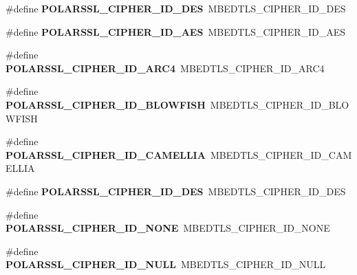 \begin{DoxyCompactItemize}
\#define {\bfseries P\+O\+L\+A\+R\+S\+S\+L\+\_\+\+C\+I\+P\+H\+E\+R\+\_\+\+I\+D\+\_\+D\+ES}~M\+B\+E\+D\+T\+L\+S\+\_\+\+C\+I\+P\+H\+E\+R\+\_\+\+I\+D\+\_\+D\+ES
\item 
\mbox{\label{compat-1_83_8h_adab88e39846506f6247c2364210072d4}} 
\#define {\bfseries P\+O\+L\+A\+R\+S\+S\+L\+\_\+\+C\+I\+P\+H\+E\+R\+\_\+\+I\+D\+\_\+\+A\+ES}~M\+B\+E\+D\+T\+L\+S\+\_\+\+C\+I\+P\+H\+E\+R\+\_\+\+I\+D\+\_\+\+A\+ES
\item 
\mbox{\label{compat-1_83_8h_a7b0e1787741b4ef7547026c45a011726}} 
\#define {\bfseries P\+O\+L\+A\+R\+S\+S\+L\+\_\+\+C\+I\+P\+H\+E\+R\+\_\+\+I\+D\+\_\+\+A\+R\+C4}~M\+B\+E\+D\+T\+L\+S\+\_\+\+C\+I\+P\+H\+E\+R\+\_\+\+I\+D\+\_\+\+A\+R\+C4
\item 
\mbox{\label{compat-1_83_8h_aad6c4e11a37cef65e21e01202078223c}} 
\#define {\bfseries P\+O\+L\+A\+R\+S\+S\+L\+\_\+\+C\+I\+P\+H\+E\+R\+\_\+\+I\+D\+\_\+\+B\+L\+O\+W\+F\+I\+SH}~M\+B\+E\+D\+T\+L\+S\+\_\+\+C\+I\+P\+H\+E\+R\+\_\+\+I\+D\+\_\+\+B\+L\+O\+W\+F\+I\+SH
\item 
\mbox{\label{compat-1_83_8h_a9b076c3dcc9545751c82943374cd4380}} 
\#define {\bfseries P\+O\+L\+A\+R\+S\+S\+L\+\_\+\+C\+I\+P\+H\+E\+R\+\_\+\+I\+D\+\_\+\+C\+A\+M\+E\+L\+L\+IA}~M\+B\+E\+D\+T\+L\+S\+\_\+\+C\+I\+P\+H\+E\+R\+\_\+\+I\+D\+\_\+\+C\+A\+M\+E\+L\+L\+IA
\item 
\mbox{\label{compat-1_83_8h_a7cda621d0e88257c164b4672fcfd0acd}} 
\#define {\bfseries P\+O\+L\+A\+R\+S\+S\+L\+\_\+\+C\+I\+P\+H\+E\+R\+\_\+\+I\+D\+\_\+\+D\+ES}~M\+B\+E\+D\+T\+L\+S\+\_\+\+C\+I\+P\+H\+E\+R\+\_\+\+I\+D\+\_\+\+D\+ES
\item 
\mbox{\label{compat-1_83_8h_a3bc293c59d79997b1775fe47fa40c1c0}} 
\#define {\bfseries P\+O\+L\+A\+R\+S\+S\+L\+\_\+\+C\+I\+P\+H\+E\+R\+\_\+\+I\+D\+\_\+\+N\+O\+NE}~M\+B\+E\+D\+T\+L\+S\+\_\+\+C\+I\+P\+H\+E\+R\+\_\+\+I\+D\+\_\+\+N\+O\+NE
\item 
\mbox{\label{compat-1_83_8h_a16de9ada8f2705d775b7e9e0c971b8d7}} 
\#define {\bfseries P\+O\+L\+A\+R\+S\+S\+L\+\_\+\+C\+I\+P\+H\+E\+R\+\_\+\+I\+D\+\_\+\+N\+U\+LL}~M\+B\+E\+D\+T\+L\+S\+\_\+\+C\+I\+P\+H\+E\+R\+\_\+\+I\+D\+\_\+\+N\+U\+LL
\item 

\end{DoxyCompactItemize}
